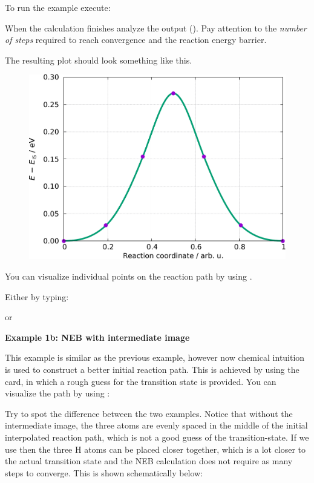 \documentclass[landscape]{foils}
\begin{document}

To run the example execute:


When the calculation finishes analyze the output
(). Pay attention to the {\em number of steps} required
to reach convergence and the reaction energy barrier.


The resulting plot should look something like this.
\begin{figure}
  \centering
    \includegraphics[width=14cm]{figs/H2+H-NEB-path.pdf}
\end{figure}

You can visualize individual points on the reaction path by using .

Either by typing:


or


{\bf Example 1b: NEB with intermediate image}

This example is similar as the previous example, however now chemical
intuition is used to construct a better initial reaction path. This is
achieved by using the  card, in which a
rough guess for the transition state is provided. You can visualize
the path by using :


Try to spot the difference between the two examples. Notice that
without the intermediate image, the three atoms are evenly spaced in
the middle of the initial interpolated reaction path, which is not a
good guess of the transition-state. If we use
 then the three H atoms can be placed closer
together, which is a lot closer to the actual transition state and the
NEB calculation does not require as many steps to converge. This is
shown schematically below:
\end{document}
